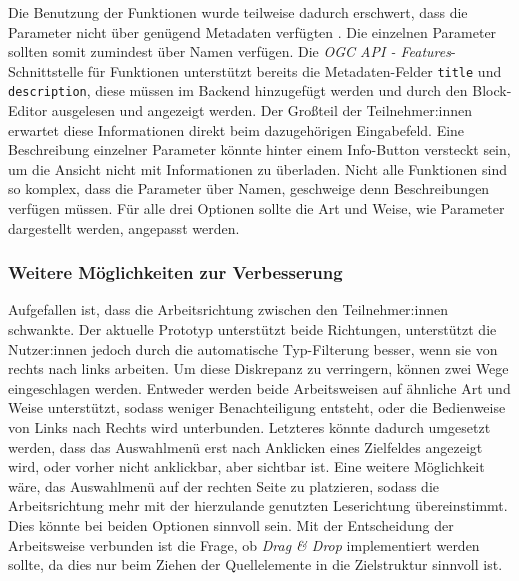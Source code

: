 Die Benutzung der Funktionen wurde teilweise dadurch erschwert, dass die Parameter nicht über genügend Metadaten verfügten . Die einzelnen Parameter sollten somit zumindest über Namen verfügen. Die \textit{OGC API - Features}-Schnittstelle für Funktionen unterstützt bereits die Metadaten-Felder \texttt{title} und \texttt{description}, diese müssen im Backend hinzugefügt werden und durch den Block-Editor ausgelesen und angezeigt werden. Der Großteil der Teilnehmer:innen erwartet diese Informationen direkt beim dazugehörigen Eingabefeld. Eine Beschreibung einzelner Parameter könnte hinter einem Info-Button versteckt sein, um die Ansicht nicht mit Informationen zu überladen. Nicht alle Funktionen sind so komplex, dass die Parameter über Namen, geschweige denn Beschreibungen verfügen müssen. Für alle drei Optionen sollte die Art und Weise, wie Parameter dargestellt werden, angepasst werden.


\subsubsection{Weitere Möglichkeiten zur Verbesserung}

Aufgefallen ist, dass die Arbeitsrichtung zwischen den Teilnehmer:innen schwankte. Der aktuelle Prototyp unterstützt beide Richtungen, unterstützt die Nutzer:innen jedoch durch die automatische Typ-Filterung besser, wenn sie von rechts nach links arbeiten. Um diese Diskrepanz zu verringern, können zwei Wege eingeschlagen werden. Entweder werden beide Arbeitsweisen auf ähnliche Art und Weise unterstützt, sodass weniger Benachteiligung entsteht, oder die Bedienweise von Links nach Rechts wird unterbunden. Letzteres könnte dadurch umgesetzt werden, dass das Auswahlmenü erst nach Anklicken eines Zielfeldes angezeigt wird, oder vorher nicht anklickbar, aber sichtbar ist. Eine weitere Möglichkeit wäre, das Auswahlmenü auf der rechten Seite zu platzieren, sodass die Arbeitsrichtung mehr mit der hierzulande genutzten Leserichtung übereinstimmt. Dies könnte bei beiden Optionen sinnvoll sein. Mit der Entscheidung der Arbeitsweise verbunden ist die Frage, ob \textit{Drag \& Drop} implementiert werden sollte, da dies nur beim Ziehen der Quellelemente in die Zielstruktur sinnvoll ist.

